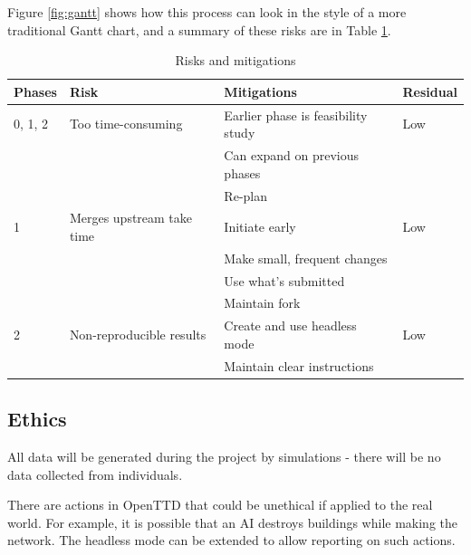 \documentclass[a4paper,11pt]{article}
\begin{document}
Figure \ref{fig:gantt} shows how this process can look in the style of a more traditional Gantt chart, and a summary of these risks are in Table \ref{fig:risks}.

\begin{table}[htbp]
    \begin{center}
        \begin{tabular}{|l|l|l|l|}
        \hline
        \textbf{Phases} & \textbf{Risk} & \textbf{Mitigations} & \textbf{Residual} \\
        \hline
        0, 1, 2 & Too time-consuming        & Earlier phase is feasibility study & Low \\
                &                           & Can expand on previous phases      & \\
                &                           & Re-plan                            & \\
        1       & Merges upstream take time & Initiate early                     & Low \\
                &                           & Make small, frequent changes       & \\
                &                           & Use what's submitted               & \\
                &                           & Maintain fork                      & \\
        2       & Non-reproducible results  & Create and use headless mode       & Low \\
                &                           & Maintain clear instructions        & \\
        \hline
        \end{tabular} 
    \end{center}
    \caption[Risks and mitigations]{Risks and mitigations}
    \label{fig:risks}
\end{table}

\subsection{Ethics}

All data will be generated during the project by simulations - there will be no data collected from individuals.

There are actions in OpenTTD that could be unethical if applied to the real world. For example, it is possible that an AI destroys buildings while making the network. The headless mode can be extended to allow reporting on such actions.
\end{document}
